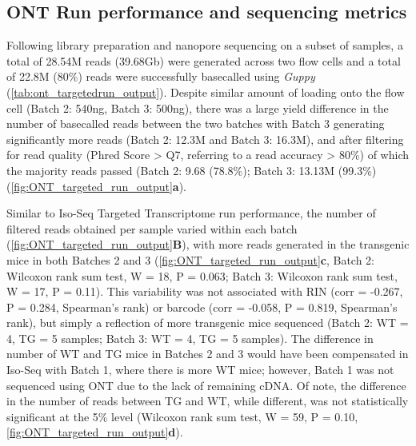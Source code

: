 \subsection{ONT Run performance and sequencing metrics}
Following library preparation and nanopore sequencing on a subset of samples, a total of 28.54M reads (39.68Gb) were generated across two flow cells and a total of 22.8M (80\%) reads were successfully basecalled using \textit{Guppy} (\cref{tab:ont_targetedrun_output}). Despite similar amount of loading onto the flow cell (Batch 2: 540ng, Batch 3: 500ng), there was a large yield difference in the number of basecalled reads between the two batches with Batch 3 generating significantly more reads (Batch 2: 12.3M and Batch 3: 16.3M), and after filtering for read quality (Phred Score > Q7, referring to a read accuracy > 80\%) of which the majority reads passed (Batch 2: 9.68 (78.8\%); Batch 3: 13.13M (99.3\%) (\cref{fig:ONT_targeted_run_output}\textbf{a}). 

Similar to Iso-Seq Targeted Transcriptome run performance, the number of filtered reads obtained per sample varied within each batch (\cref{fig:ONT_targeted_run_output}\textbf{B}), with more reads generated in the transgenic mice in both Batches 2 and 3 (\cref{fig:ONT_targeted_run_output}\textbf{c}, Batch 2: Wilcoxon rank sum test, W = 18, P = 0.063; Batch 3: Wilcoxon rank sum test, W = 17, P = 0.11). This variability was not associated with RIN (corr = -0.267, P = 0.284, Spearman's rank) or barcode (corr = -0.058, P = 0.819, Spearman's rank), but simply a reflection of more transgenic mice sequenced (Batch 2: WT = 4, TG = 5 samples; Batch 3: WT = 4, TG = 5 samples). The difference in number of WT and TG mice in Batches 2 and 3 would have been compensated in Iso-Seq with Batch 1, where there is more WT mice; however, Batch 1 was not sequenced using ONT due to the lack of remaining cDNA. Of note, the difference in the number of reads between TG and WT, while different, was not statistically significant at the 5\% level (Wilcoxon rank sum test, W = 59, P = 0.10, \cref{fig:ONT_targeted_run_output}\textbf{d}).
  
